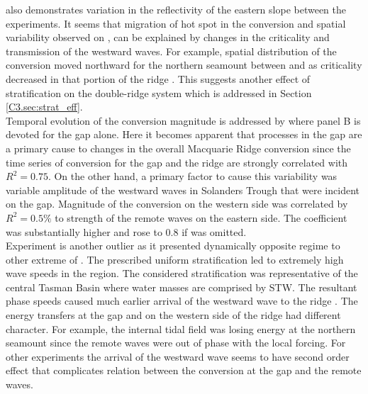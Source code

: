 \documentclass[12pt]{article}
\begin{document}
 also demonstrates variation in the reflectivity of the eastern slope between 
the 
experiments. 
It seems that migration of hot spot in the conversion and spatial variability observed on  
, can be explained 
by changes in the criticality and transmission of the westward waves. For example, spatial 
distribution of the conversion moved northward for the northern seamount between  and 
  as criticality decreased in that portion of the ridge 
. This suggests another effect of stratification on the double-ridge system 
which is addressed in Section \ref{C3.sec:strat_eff}.\\

Temporal evolution of the conversion magnitude is addressed by  
where panel B is devoted for the gap alone. Here it becomes apparent that processes in the gap are 
a primary cause to changes in the overall Macquarie Ridge conversion since the time series of 
conversion for the gap and the ridge are strongly correlated with $R^2 = 0.75$. On the other hand, 
a primary factor to cause this variability was variable amplitude of the westward waves in 
Solanders Trough that were incident on the gap. Magnitude of the conversion on the western side was 
correlated by $R^2 = 0.5\%$ to strength of the remote waves on the eastern side. The coefficient 
was substantially higher and rose to $0.8$ if  was omitted.\\

Experiment  is another outlier as it presented dynamically opposite regime to other 
extreme of . The prescribed uniform 
stratification 
led to extremely high wave speeds in the region. The considered stratification was representative 
of the central Tasman Basin where water masses are comprised by STW. The resultant phase speeds 
caused much earlier arrival of the westward wave to the ridge . The energy transfers at the gap and on the western side of the ridge had different 
character. For example, the internal tidal field was losing energy at the northern seamount since 
the remote waves were out of phase with the local forcing. For other experiments the arrival 
of the westward wave seems to have second order effect that complicates relation between the 
conversion at the gap and the remote waves.
\end{document}
